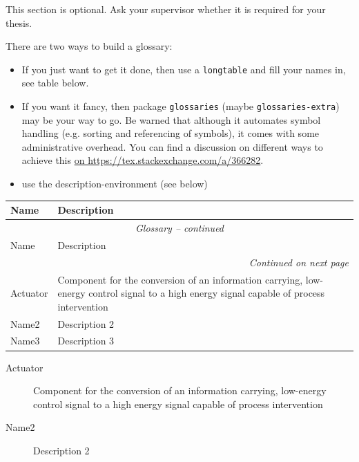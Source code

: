 \cleardoublepage
{}

This section is optional.
Ask your supervisor whether it is required for your thesis.

There are two ways to build a glossary:

\begin{itemize}
    \item If you just want to get it done, then use a \texttt{longtable} and fill your names in, see table below.
    \item If you want it fancy, then package \texttt{glossaries} (maybe \texttt{glossaries-extra}) may be your way to go.
    Be warned that although it automates symbol handling (e.g. sorting and referencing of symbols), it comes with some administrative overhead.
    You can find a discussion on different ways to achieve this \href{https://tex.stackexchange.com/a/366282}{on https://tex.stackexchange.com/a/366282}.
\item use the description-environment (see below)
\end{itemize}

\begin{center}
\begin{longtable}{@{}l p{10cm}@{}}
\toprule
Name & Description \\
\midrule
\endfirsthead
\multicolumn{2}{c}{\textit{Glossary -- continued}}\\
\toprule
Name & Description \\
\midrule
\endhead
\bottomrule \multicolumn{2}{r}{\textit{Continued on next page}} \\
\endfoot
\bottomrule
\endlastfoot

Actuator & Component for the conversion of an information carrying, low-energy control signal to a high energy signal capable of process intervention \\
Name2 & Description 2 \\
Name3 & Description 3 \\
\end{longtable}
\end{center}

\begin{description}
    \item [Actuator] Component for the conversion of an information carrying, low-energy control signal to a high energy signal capable of process intervention
    \item [Name2] Description 2
\end{description}

